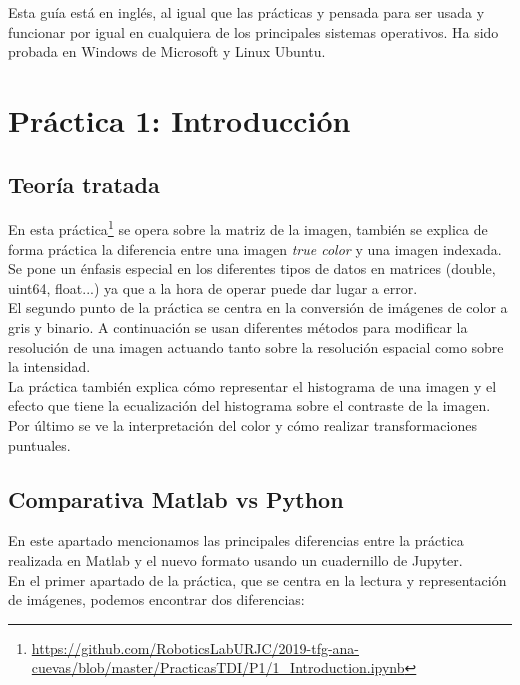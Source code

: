 Esta guía está en inglés, al igual que las prácticas y pensada para ser usada y funcionar por igual en cualquiera de los principales sistemas operativos. Ha sido probada en Windows de Microsoft y Linux Ubuntu.\\

\section{ Práctica 1: Introducción}

\subsection{Teoría tratada}

En esta práctica\footnote{\url{https://github.com/RoboticsLabURJC/2019-tfg-ana-cuevas/blob/master/PracticasTDI/P1/1_Introduction.ipynb}} se opera sobre la matriz de la imagen, también se explica de forma práctica la diferencia entre una imagen \emph{true color} y una imagen indexada. Se pone un énfasis especial en los diferentes tipos de datos en matrices (double, uint64, float...) ya que a la hora de operar puede dar lugar a error.\\

El segundo punto de la práctica se centra en la conversión de imágenes de color a gris y binario. A continuación se usan diferentes métodos para modificar la resolución de una imagen actuando tanto sobre la resolución espacial como sobre la intensidad.\\

La práctica también explica cómo representar el histograma de una imagen y el efecto que tiene la ecualización del histograma sobre el contraste de la imagen.\\

Por último se ve la interpretación del color y cómo realizar transformaciones puntuales.\\

\subsection{Comparativa Matlab vs Python}

En este apartado mencionamos las principales diferencias entre la práctica realizada en Matlab y el nuevo formato usando un cuadernillo de Jupyter.\\

En el primer apartado de la práctica, que se centra en la lectura y representación de imágenes, podemos encontrar dos diferencias:\\

